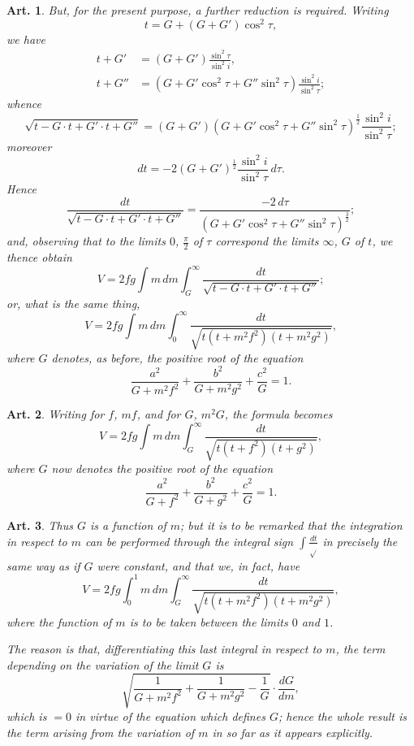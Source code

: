 \documentclass[12pt,a4paper]{article}
\theoremstyle{cayley}
\newtheorem{art}{Art.}[section]
\begin{document}
\begin{art}
But, for the present purpose, a further reduction is required. Writing
\[ t = G + (G + G')\cos^2\tau, \]
we have
\begin{align*}
t + G' &= (G + G')\frac{\sin^2\tau}{\sin^2 i}, \\
t + G'' &= (G + G'\cos^2\tau + G''\sin^2\tau)\frac{\sin^2 i}{\sin^2\tau};
\end{align*}
whence
\[
\sqrt{t - G \cdot t + G' \cdot t + G''} = (G + G')(G + G'\cos^2\tau + G''\sin^2\tau)^{\frac{1}{2}}\frac{\sin^2 i}{\sin^2\tau};
\]
moreover
\[ dt = -2(G + G')^{\frac{1}{2}}\frac{\sin^2 i}{\sin^2\tau}\,d\tau. \]
Hence
\[
\frac{dt}{\sqrt{t - G \cdot t + G' \cdot t + G''}} = \frac{-2\,d\tau}{(G + G'\cos^2\tau + G''\sin^2\tau)^{\frac{3}{2}}};
\]
and, observing that to the limits $0$, $\frac{\pi}{2}$ of $\tau$ correspond the limits $\infty$, $G$ of $t$, we thence obtain
\[
V = 2fg\int m\,dm\int_G^{\infty} \frac{dt}{\sqrt{t - G \cdot t + G' \cdot t + G''}};
\]
or, what is the same thing,
\[
V = 2fg\int m\,dm\int_0^{\infty} \frac{dt}{\sqrt{t(t + m^2f^2)(t + m^2g^2)}},
\]
where $G$ denotes, as before, the positive root of the equation
\[
\frac{a^2}{G + m^2f^2} + \frac{b^2}{G + m^2g^2} + \frac{c^2}{G} = 1.
\]
\end{art}

\begin{art}
Writing for $f$, $mf$, and for $G$, $m^2G$, the formula becomes
\[
V = 2fg\int m\,dm\int_G^{\infty} \frac{dt}{\sqrt{t(t + f^2)(t + g^2)}},
\]
where $G$ now denotes the positive root of the equation
\[
\frac{a^2}{G + f^2} + \frac{b^2}{G + g^2} + \frac{c^2}{G} = 1.
\]
\end{art}

\begin{art}
Thus $G$ is a function of $m$; but it is to be remarked that the integration in respect to $m$ can be performed through the integral sign $\int\frac{dt}{\sqrt{}}$ in precisely the same way as if $G$ were constant, and that we, in fact, have
\[
V = 2fg\int_0^1 m\,dm\int_G^{\infty} \frac{dt}{\sqrt{t(t + m^2f^2)(t + m^2g^2)}},
\]
where the function of $m$ is to be taken between the limits $0$ and $1$.

The reason is that, differentiating this last integral in respect to $m$, the term depending on the variation of the limit $G$ is
\[
\sqrt{\frac{1}{G + m^2f^2} + \frac{1}{G + m^2g^2} - \frac{1}{G}} \cdot \frac{dG}{dm},
\]
which is $=0$ in virtue of the equation which defines $G$; hence the whole result is the term arising from the variation of $m$ in so far as it appears explicitly.
\end{art}
\end{document}
